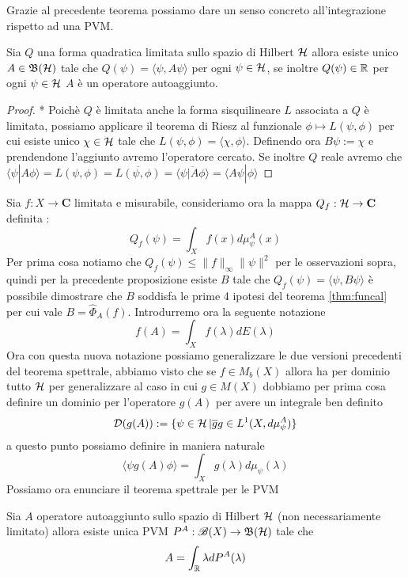 Grazie al precedente teorema possiamo dare un senso concreto all'integrazione rispetto ad una PVM.
\begin{proposition}
    Sia $Q$ una forma quadratica limitata sullo spazio di Hilbert $\operatorname{\mathcal{H}}$ allora esiste unico $A \in \operatorname{\mathfrak{B}(\mathcal{H})}$ tale che $Q(\psi)= \langle \psi , A \psi \rangle$ per ogni $\psi \in \operatorname{\mathcal{H}}$, se inoltre $Q(\psi) \in \operatorname{\mathbb{R}}$ per ogni $\psi \in \operatorname{\mathcal{H}}$ $A$ è un operatore autoaggiunto. 
\end{proposition}
\begin{proof}* 
    Poichè $Q$ è limitata anche la forma sisquilineare $L$ associata a $Q$ è limitata, possiamo applicare il teorema di Riesz al funzionale $\phi \mapsto L(\psi, \phi)$ per cui esiste unico $\chi \in \operatorname{\mathcal{H}}$ tale che $L(\psi, \phi) = \langle \chi , \phi \rangle$. Definendo ora $B\psi := \chi$ e prendendone l'aggiunto avremo l'operatore cercato. Se inoltre $Q$ reale avremo che $\langle \psi |A\phi \rangle =L(\psi, \phi)=\overline{L(\psi, \phi)}= \overline{\langle \psi |A \phi \rangle} = \langle A \psi | \phi \rangle$
\end{proof}

Sia $f: X \to \mathbf{C}$ limitata e misurabile, consideriamo ora la mappa $Q_f : \operatorname{\mathcal{H}} \to \mathbf{C}$ definita :
$$Q_f(\psi)= \int_{X}f(x) d \mu_\psi^A(x)$$
Per prima cosa notiamo che $Q_f(\psi) \leq \| f\|_\infty \| \psi \|^2$ per le osservazioni sopra, quindi per la precedente proposizione esiste $B$ tale che $Q_f(\psi) =\langle \psi , B \psi \rangle$ è possibile dimostrare che $B$ soddisfa le prime 4 ipotesi del teorema \ref{thm:funcal} per cui vale $B = \hat{\Phi}_A(f)$. Introdurremo ora la seguente notazione $$ f(A)= \int_X f(\lambda)dE(\lambda)$$ Ora con questa nuova notazione possiamo generalizzare le due versioni precedenti del teorema spettrale, abbiamo visto che se $f \in M_b(X)$ allora ha per dominio tutto $\operatorname{\mathcal{H}}$ per generalizzare al caso in cui $g \in M(X)$ dobbiamo per prima cosa definire un dominio per l'operatore $g(A)$ per avere un integrale ben definito $$\mathcal{D}(g(A)):= \{ \psi \in \operatorname{\mathcal{H}} | \overline{g}g\in L^1(X , d\mu_\psi^A)\}$$ a questo punto possiamo definire in maniera naturale $$\langle \psi g(A)\phi \rangle = \int_X g(\lambda) d\mu_\psi(\lambda)$$ Possiamo ora enunciare il teorema spettrale per le PVM
\begin{theorem}
    Sia $A$ operatore autoaggiunto sullo spazio di Hilbert $\operatorname{\mathcal{H}}$ (non necessariamente limitato) allora esiste unica PVM $P^A: \mathscr{B}(X)\to \operatorname{\mathfrak{B}(\mathcal{H})}$ tale che $$A= \int_{\operatorname{\mathbb{R}}} \lambda dP^A(\lambda)$$ 
\end{theorem}

